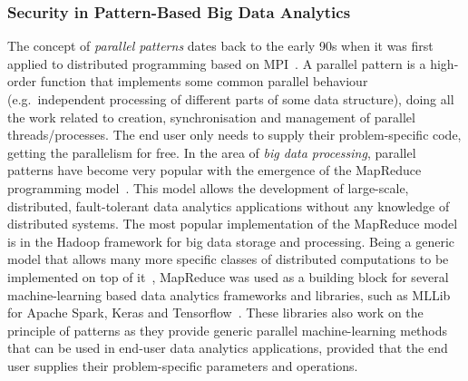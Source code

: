\documentclass[a4paper,11pt]{article}
\begin{document}
\subsubsection{Security in Pattern-Based Big Data Analytics}
\label{sect:patterns}

The concept of \emph{parallel patterns} dates back to the early 90s when it was first applied to distributed programming based on MPI~\cite{cole89skeletons}. A parallel pattern is a high-order function that implements some common parallel behaviour (e.g.~independent processing of different parts of some data structure), doing all the work related to creation, synchronisation and management of parallel threads/processes. The end user only needs to supply their problem-specific code, getting the parallelism for free. 
In the area of \emph{big data processing}, parallel patterns have become very popular with the emergence of the MapReduce programming model~\cite{mapreduce}. This model allows the development of large-scale, distributed, fault-tolerant data analytics applications without any knowledge of distributed systems. The most popular implementation of the MapReduce model is in the Hadoop framework for big data storage and processing. Being a generic model that allows many more specific classes of distributed computations to be implemented on top of it~\cite{bigdatabook}, MapReduce was used as a building block for several machine-learning based data analytics frameworks and libraries, such as MLLib~\cite{mllib} for Apache Spark, Keras and Tensorflow~\cite{tensorflow}. These libraries also work on the principle of patterns as they provide generic parallel machine-learning methods that can be used in end-user data analytics applications, provided that the end user supplies their problem-specific parameters and operations.
%
\end{document}
